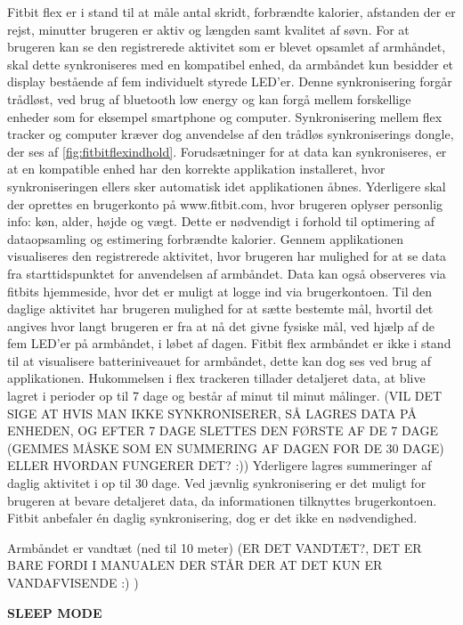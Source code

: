 Fitbit flex er i stand til at måle antal skridt, forbrændte kalorier, afstanden der er rejst, minutter brugeren er aktiv og længden samt kvalitet af søvn. 
For at brugeren kan se den registrerede aktivitet  som er blevet opsamlet af armhåndet, skal dette synkroniseres med en kompatibel enhed, da armbåndet kun besidder et display bestående af fem individuelt styrede LED'er.  
Denne synkronisering forgår trådløst, ved brug af bluetooth low energy og kan forgå mellem forskellige enheder som for eksempel smartphone og computer. 
Synkronisering mellem flex tracker og computer kræver dog anvendelse af den trådløs synkroniserings dongle, der ses af \autoref{fig:fitbitflexindhold}.
Forudsætninger for at data kan synkroniseres, er at en kompatible enhed har den korrekte applikation installeret, hvor synkroniseringen ellers sker automatisk idet applikationen åbnes.  
Yderligere skal der oprettes en brugerkonto på www.fitbit.com, hvor brugeren oplyser personlig info: køn, alder, højde og vægt. Dette er nødvendigt i forhold til optimering af dataopsamling og estimering forbrændte kalorier.  
Gennem applikationen visualiseres den registrerede aktivitet, hvor brugeren har mulighed for at se data fra starttidspunktet for anvendelsen af armbåndet. Data kan også observeres via  fitbits hjemmeside, hvor det er muligt at logge ind via brugerkontoen. 
Til den daglige aktivitet har brugeren mulighed for at sætte bestemte mål, hvortil det angives hvor langt brugeren er fra at nå det givne fysiske mål, ved hjælp af de fem LED'er på armbåndet, i løbet af dagen.
Fitbit flex armbåndet er ikke i stand til at visualisere batteriniveauet for armbåndet, dette kan dog ses ved brug af applikationen. 
Hukommelsen i flex trackeren tillader detaljeret data, at blive lagret i perioder op til 7 dage og består af minut til minut målinger. (VIL DET SIGE AT HVIS MAN IKKE SYNKRONISERER, SÅ LAGRES DATA PÅ ENHEDEN, OG EFTER 7 DAGE SLETTES DEN FØRSTE AF DE 7 DAGE (GEMMES MÅSKE SOM EN SUMMERING AF DAGEN FOR DE 30 DAGE) ELLER HVORDAN FUNGERER DET? :)) 
Yderligere lagres summeringer af daglig aktivitet i op til 30 dage.
Ved jævnlig synkronisering er det muligt for brugeren at bevare detaljeret data, da informationen tilknyttes brugerkontoen. 
Fitbit anbefaler én daglig synkronisering, dog er det ikke en nødvendighed. 

Armbåndet er vandtæt (ned til 10 meter) (ER DET VANDTÆT?, DET ER BARE FORDI I MANUALEN DER STÅR DER AT DET KUN ER VANDAFVISENDE :) )

\textbf{SLEEP MODE}


